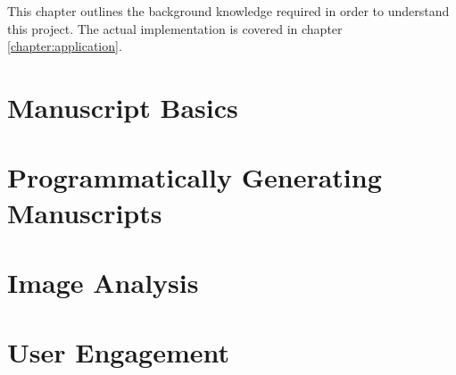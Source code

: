 This chapter outlines the background knowledge required in order to understand this project. The actual implementation is covered in chapter \ref{chapter:application}.

\section{Manuscript Basics}


\section{Programmatically Generating Manuscripts}


\section{Image Analysis}


\section{User Engagement}
\label{section:engagement}

